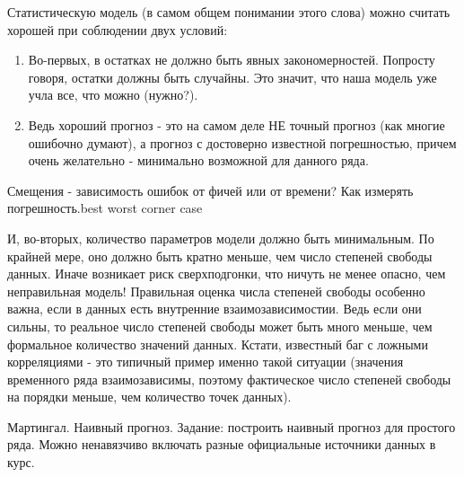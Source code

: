 Статистическую модель (в самом общем понимании этого слова) можно
считать хорошей при соблюдении двух условий:

\begin{enumerate}
  \item Во-первых, в остатках не должно быть явных закономерностей. Попросту
    говоря, остатки должны быть случайны. Это значит, что наша модель уже
    учла все, что можно (нужно?).
  \item Ведь хороший прогноз - это на самом деле НЕ точный прогноз
    (как многие ошибочно думают), а прогноз с достоверно известной
    погрешностью, причем очень желательно - минимально возможной для
    данного ряда.
\end{enumerate}

Смещения - зависимость ошибок от фичей или от времени?
Как измерять погрешность.best worst corner case

И, во-вторых, количество параметров модели должно быть минимальным.
По крайней мере, оно должно быть кратно меньше, чем число степеней
свободы данных. Иначе возникает риск сверхподгонки, что ничуть не
менее опасно, чем неправильная модель! Правильная оценка числа
степеней свободы особенно важна, если в данных есть внутренние
взаимозависимостии. Ведь если они сильны, то реальное число степеней
свободы может быть много меньше, чем формальное количество значений
данных. Кстати, известный баг с ложными корреляциями - это типичный
пример именно такой ситуации (значения временного ряда
  взаимозависимы, поэтому фактическое число степеней свободы на порядки
меньше, чем количество точек данных).

Мартингал. Наивный прогноз.
Задание: построить наивный прогноз для простого ряда. Можно
ненавязчиво включать разные официальные источники данных в курс.